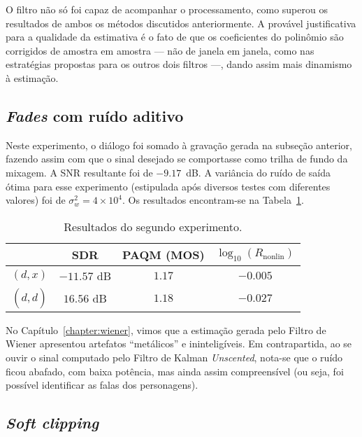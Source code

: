 O filtro não só foi capaz de acompanhar o processamento, como superou os resultados de
ambos os métodos discutidos anteriormente. A provável justificativa para a qualidade da
estimativa é o fato de que os coeficientes do polinômio são corrigidos de amostra em
amostra --- não de janela em janela, como nas estratégias propostas para os outros dois
filtros ---, dando assim mais dinamismo à estimação.

\subsection{\textit{Fades} com ruído aditivo}

Neste experimento, o diálogo foi somado à gravação gerada na subseção anterior, fazendo
assim com que o sinal desejado se comportasse como trilha de fundo da mixagem. A SNR
resultante foi de $-9.17$~dB. A variância do ruído de saída ótima para esse experimento
(estipulada após diversos testes com diferentes valores) foi de $\sigma_w^2 = 4 \times
	10^{4}$. Os resultados encontram-se na Tabela~\ref{tab:unscented:experiment-2}.
{\def\arraystretch{1.25}\tabcolsep=10pt
\begin{table}[!ht]
	\centering
	\caption[Resultados do segundo experimento: \textit{fades} com ruído aditivo]{Resultados do segundo experimento.}
	\label{tab:unscented:experiment-2}
	\begin{tabular}{cccc}
		\toprule
		               & SDR         & PAQM (MOS) & $\log_{10}(R_{\text{nonlin}})$ \\
		\midrule
		$(d, x)$       & $-11.57$ dB & $1.17$     & $-0.005$                       \\
		$(d, \hat{d})$ & $16.56$ dB  & $1.18$     & $-0.027$                       \\ \bottomrule
	\end{tabular}
\end{table}
}

No Capítulo~\ref{chapter:wiener}, vimos que a estimação gerada pelo Filtro de Wiener
apresentou artefatos ``metálicos'' e ininteligíveis. Em contrapartida, ao se ouvir o
sinal computado pelo Filtro de Kalman \textit{Unscented}, nota-se que o ruído ficou
abafado, com baixa potência, mas ainda assim compreensível (ou seja, foi possível
identificar as falas dos personagens).

\subsection{\textit{Soft clipping}}

